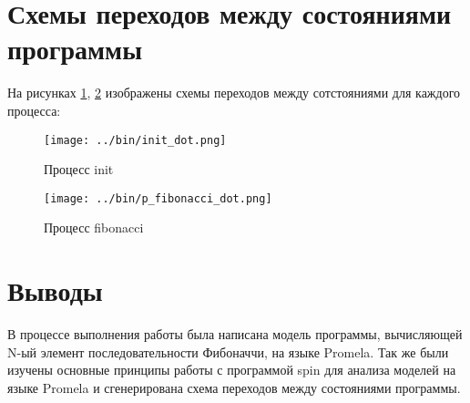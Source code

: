 \documentclass[a4paper,12pt]{report}
\begin{document}
\section*{Схемы переходов между состояниями программы}
На рисунках \ref{fig:init}, \ref{fig:p_fibonacci} изображены схемы переходов между сотстояниями для каждого процесса: 

\begin{figure}
\centering
\texttt{[image: ../bin/init\_dot.png]}
\caption{Процесс init}
\label{fig:init}
\end{figure}

\begin{figure}
\centering
\texttt{[image: ../bin/p\_fibonacci\_dot.png]}
\caption{Процесс fibonacci}
\label{fig:p_fibonacci}
\end{figure}

\section*{Выводы}

В процессе выполнения работы была написана модель программы, 
вычисляющей N-ый элемент последовательности Фибоначчи, на языке Promela. 
Так же были изучены основные принципы работы с программой spin для анализа 
моделей на языке Promela и сгенерирована схема переходов между состояниями программы.
\end{document}
